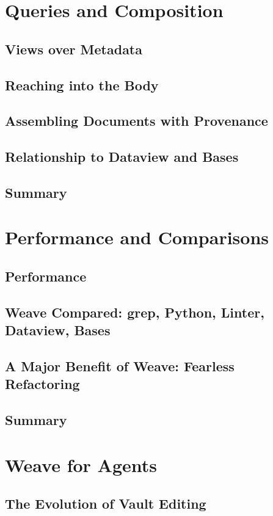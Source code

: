 \documentclass[nohyper,nobib]{tufte-book}
\begin{document}
\chapter{Queries and Composition}
\section{Views over Metadata}
\section{Reaching into the Body}
\section{Assembling Documents with Provenance}
\section{Relationship to Dataview and Bases}
\section{Summary}

\chapter{Performance and Comparisons}
\section{Performance}
\section{Weave Compared: grep, Python, Linter, Dataview, Bases}
\section{A Major Benefit of Weave: Fearless Refactoring}
\section{Summary}

\chapter{Weave for Agents}
\section{The Evolution of Vault Editing}
\end{document}
